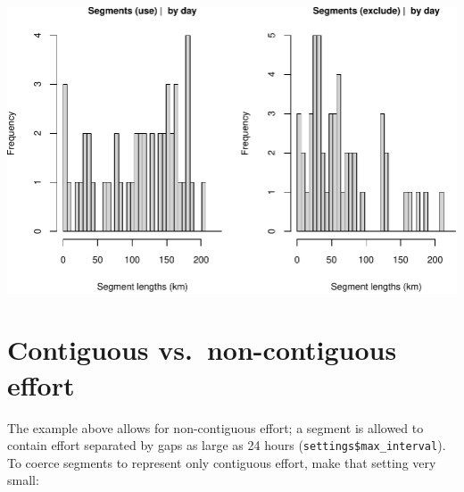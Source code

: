\documentclass[
]{book}
\newenvironment{Shaded}{\begin{snugshade}}{\end{snugshade}}
\newcommand{\CommentTok}[1]{\textcolor[rgb]{0.56,0.35,0.01}{\textit{#1}}}
\newcommand{\DataTypeTok}[1]{\textcolor[rgb]{0.13,0.29,0.53}{#1}}
\newcommand{\DecValTok}[1]{\textcolor[rgb]{0.00,0.00,0.81}{#1}}
\newcommand{\KeywordTok}[1]{\textcolor[rgb]{0.13,0.29,0.53}{\textbf{#1}}}
\newcommand{\NormalTok}[1]{#1}
\newcommand{\OperatorTok}[1]{\textcolor[rgb]{0.81,0.36,0.00}{\textbf{#1}}}
\newcommand{\OtherTok}[1]{\textcolor[rgb]{0.56,0.35,0.01}{#1}}
\newcommand{\StringTok}[1]{\textcolor[rgb]{0.31,0.60,0.02}{#1}}
\begin{document}
\begin{Shaded}
\end{Shaded}

\includegraphics{figures/unnamed-chunk-63-1.pdf}

\hypertarget{contiguous-vs.-non-contiguous-effort}{%
\section*{Contiguous vs.~non-contiguous effort}\label{contiguous-vs.-non-contiguous-effort}}

The example above allows for non-contiguous effort; a segment is allowed to contain effort separated by gaps as large as 24 hours (\texttt{settings\$max\_interval}). To coerce segments to represent only contiguous effort, make that setting very small:
\end{document}
